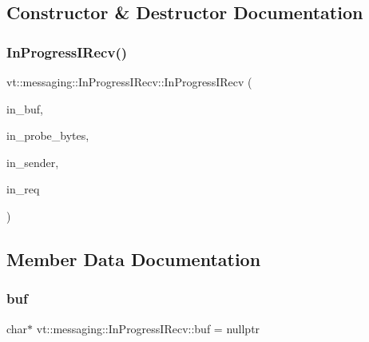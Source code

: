 \subsection{Constructor \& Destructor Documentation}
\mbox{\label{structvt_1_1messaging_1_1_in_progress_i_recv_ad9e4660352bfa1843c2757ef4795f0d5}} 
\subsubsection{\texorpdfstring{In\+Progress\+I\+Recv()}{InProgressIRecv()}}
{\footnotesize\ttfamily vt\+::messaging\+::\+In\+Progress\+I\+Recv\+::\+In\+Progress\+I\+Recv (\begin{DoxyParamCaption}\item[{char $\ast$}]{in\+\_\+buf,  }\item[{\hyperlink{structvt_1_1messaging_1_1_in_progress_i_recv_a2a3824ca08dcfc5a3278882c1df8edd6}{Count\+Type}}]{in\+\_\+probe\+\_\+bytes,  }\item[{\hyperlink{namespacevt_a866da9d0efc19c0a1ce79e9e492f47e2}{Node\+Type}}]{in\+\_\+sender,  }\item[{M\+P\+I\+\_\+\+Request}]{in\+\_\+req }\end{DoxyParamCaption})\hspace{0.3cm}{\ttfamily [inline]}}



\subsection{Member Data Documentation}
\mbox{\label{structvt_1_1messaging_1_1_in_progress_i_recv_a9b9fa3b3405847857324d448dee6abc9}} 
\subsubsection{\texorpdfstring{buf}{buf}}
{\footnotesize\ttfamily char$\ast$ vt\+::messaging\+::\+In\+Progress\+I\+Recv\+::buf = nullptr}

